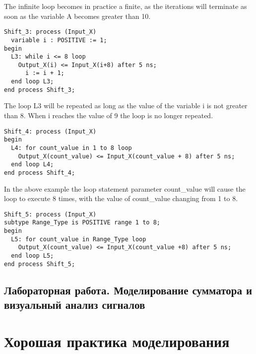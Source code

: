The infinite loop becomes in practice a finite, as the iterations will terminate as soon as the variable A becomes greater than 10.


\begin{Code}
\begin{lstlisting}[caption=Синтаксис циклов, label=loop_3]
Shift_3: process (Input_X)
  variable i : POSITIVE := 1;
begin
  L3: while i <= 8 loop
    Output_X(i) <= Input_X(i+8) after 5 ns;
      i := i + 1;
  end loop L3;
end process Shift_3;
\end{lstlisting}
\end{Code}

The loop L3 will be repeated as long as the value of the variable i is not greater than 8. When i reaches the value of 9 the loop is no longer repeated.


\begin{Code}
\begin{lstlisting}[caption=Синтаксис циклов, label=loop_4]
Shift_4: process (Input_X)
begin
  L4: for count_value in 1 to 8 loop
    Output_X(count_value) <= Input_X(count_value + 8) after 5 ns;
  end loop L4;
end process Shift_4;
\end{lstlisting}
\end{Code}

In the above example the loop statement parameter count\_value will cause the loop to execute 8 times, with the value of count\_value changing from 1 to 8.


\begin{Code}
\begin{lstlisting}[caption=Синтаксис циклов, label=loop_5]
Shift_5: process (Input_X)
subtype Range_Type is POSITIVE range 1 to 8;
begin
  L5: for count_value in Range_Type loop
    Output_X(count_value) <= Input_X(count_value +8) after 5 ns;
  end loop L5;
end process Shift_5;
\end{lstlisting}
\end{Code}

\subsection{Лабораторная работа. Моделирование сумматора и визуальный анализ сигналов}



\section{Хорошая практика моделирования}

